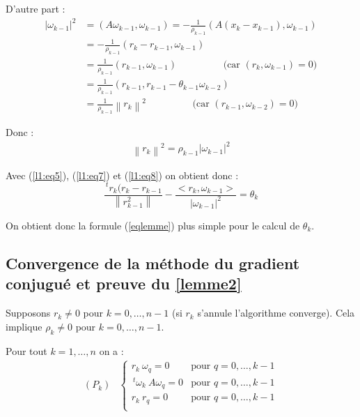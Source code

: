 \documentclass[a4paper,11pt]{article}
\newcommand{\norm}[1]{\left\lVert#1\right\rVert}
\newcommand{\tpo}[1]{\,^t#1}
\theoremstyle{plain} %
\begin{document}
D'autre part :
\begin{align*}
    |\omega_{k-1}|^2 & = (A \omega_{k-1}, \omega_{k-1}) = -\frac{1}{\rho_{k-1}}(A (x_k - x_{k-1}), \omega_{k-1}) \\
    & = -\frac{1}{\rho_{k-1}}(r_k - r_{k-1} , \omega_{k-1}) \\
    & = \frac{1}{\rho_{k-1}}(r_{k-1}, \omega_{k-1}) \hspace{2cm} \text{(car $(r_k,\omega_{k-1}) = 0$)}\\
    & = \frac{1}{\rho_{k-1}}(r_{k-1},r_{k-1}- \theta_{k-1}\omega_{k-2}) \\
    & = \frac{1}{\rho_{k-1}}\norm{r_k}^2 \hspace{2cm} \text{(car $(r_{k-1}, \omega_{k-2}) = 0$)}
\end{align*}

Donc :
\begin{align}
    \norm{r_k}^2 = \rho_{k-1} |\omega_{k-1}|^2
    \label{l1:eq8}
\end{align}

Avec (\ref{l1:eq5}), (\ref{l1:eq7}) et (\ref{l1:eq8}) on obtient donc :
\[
    \frac{\tpo r_k (r_k - r_{k-1}}{\norm{r_{k-1}^2}}  - \frac{<r_k,\omega_{k-1}>}{|\omega_{k-1}|^2} = \theta_k
\]

On obtient donc la formule (\ref{eqlemme}) plus simple pour le calcul de $\theta_k$.

\subsection{Convergence de la méthode du gradient conjugué et preuve du \ref{lemme2}}

Supposons $r_k \ne 0$ pour $k = 0,\dots,n-1$ (si $r_k$ s'annule l'algorithme converge). Cela implique
$\rho_k \ne 0$ pour $k=0,\dots,n-1$.

\begin{lemme}
    Pour tout $k=1,\dots,n$ on a :
    \[
        \begin{array}{cc}
            (P_k) &
            \left\lbrace
            \begin{array}{cc}
                r_k \: \omega_q = 0 & \text{pour $q = 0,\dots,k-1$} \\
                \tpo \omega_k \: A \omega_q = 0 & \text{pour $q = 0,\dots,k-1$} \\
                r_k \: r_q = 0 & \text{pour $q = 0,\dots,k-1$} \\
            \end{array}
            \right.
        \end{array}
    \]
\end{lemme}
\end{document}
